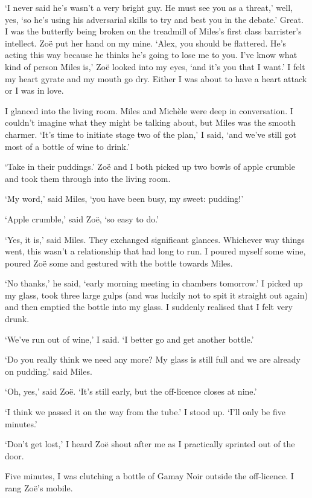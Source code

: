 `I never said he's wasn't a very bright guy. He must see you as a
threat,' well, yes, `so he's using his adversarial skills to try and
best you in the debate.' Great. I was the butterfly being broken on
the treadmill of Miles's first class barrister's intellect. Zo{\"e}
put her hand on my mine. `Alex, you should be flattered. He's acting
this way because he thinks he's going to lose me to you. I've know
what kind of person Miles is,' Zo{\"e} looked into my eyes, `and
it's you that I want.' I felt my heart gyrate and my mouth go dry.
Either I was about to have a heart attack or I was in love.

I glanced into the living room. Miles and Mich{\`e}le were deep in
conversation. I couldn't imagine what they might be talking about,
but Miles was the smooth charmer. `It's time to initiate stage two
of the plan,' I said, `and we've still got most of a bottle of wine
to drink.'

`Take in their puddings.' Zo{\"e} and I both picked up two bowls of
apple crumble and took them through into the living room.

`My word,' said Miles, `you have been busy, my sweet: pudding!'

`Apple crumble,' said Zo{\"e}, `so easy to do.'

`Yes, it is,' said Miles. They exchanged significant glances.
Whichever way things went, this wasn't a relationship that had long
to run. I poured myself some wine, poured Zo{\"e} some and gestured
with the bottle towards Miles.

`No thanks,' he said, `early morning meeting in chambers tomorrow.'
I picked up my glass, took three large gulps (and was luckily not to
spit it straight out again) and then emptied the bottle into my
glass. I suddenly realised that I felt very drunk.

`We've run out of wine,' I said. `I better go and get another
bottle.'

`Do you really think we need any more? My glass is still full and we
are already on pudding.' said Miles.

`Oh, yes,' said Zo{\"e}. `It's still early, but the off-licence
closes at nine.'

`I think we passed it on the way from the tube.' I stood up. `I'll only
be five minutes.'

`Don't get lost,' I heard Zo{\"e} shout after me as I practically
sprinted out of the door.

Five minutes, I was clutching a bottle of Gamay Noir outside the
off-licence. I rang Zo{\"e}'s mobile.

